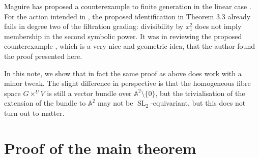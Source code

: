 \documentclass[11pt]{amsart}
\theoremstyle{plain}
\numberwithin{equation}{section}
\DeclareMathOperator{\SL}{SL}
\renewcommand{\AA}{\mathbb{A}}
\begin{document}
Maguire has proposed a counterexample to finite generation in the linear case \cite{Maguire}.
For the action intended in \cite[Thm.~5.1]{Maguire}, the proposed identification in Theorem 3.3 already fails in degree two of the filtration grading: divisibility by \(x_1^2\) does not imply membership in the second symbolic power.
It was in reviewing the proposed counterexample \cite{Maguire}, which is a very nice and geometric idea, that the author found the proof presented here.

In this note, we show that in fact the same proof as above does work with a minor tweak.
The slight difference in perspective is that the homogeneous fibre space \(G \times^U V\) is still a vector bundle over \(\AA^2 \setminus \{0\}\), but the trivialisation of the extension of the bundle to \(\AA^2\) may not be \(\SL_2\)-equivariant, but this does not turn out to matter.

\section{Proof of the main theorem}
\end{document}
